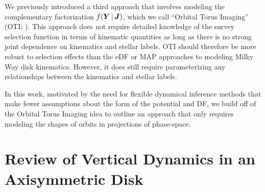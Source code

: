 We previously introduced a third approach that involves modeling the complementary
factorization $f(\boldsymbol{Y} \,|\, \boldsymbol{J})$, which we call ``Orbital Torus Imaging'' (OTI;
\citealt{PW:2021}).
This approach does not require detailed knowledge of the survey selection function in
terms of kinematic quantities as long as there is no strong joint dependence on
kinematics and stellar labels.
OTI should therefore be more robust to selection effects than the eDF or
MAP approaches to modeling Milky Way disk kinematics.
However, it does still require parameterizing any relationships between the kinematics
and stellar labels.

In this work, motivated by the need for flexible dynamical inference methods that make
fewer assumptions about the form of the potential and DF, we build off of the Orbital
Torus Imaging idea to outline an approach that only requires modeling the shapes of
orbits in projections of phase-space.


\section{Review of Vertical Dynamics in an Axisymmetric Disk} \label{sec:dynreview}

